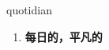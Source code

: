 
\begin{frame}
{\huge quotidian}
\begin{center}
\begin{enumerate}\Large
  \item \textbf{每日的，平凡的}
\end{enumerate}
\end{center}
\end{frame}
